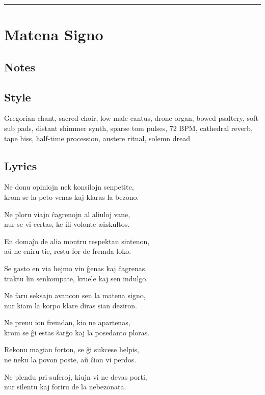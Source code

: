 \begin{center}\rule{0.5\linewidth}{0.5pt}\end{center}

\section{Matena Signo}\label{matena-signo}

\subsection{Notes}\label{notes-33}

\subsection{Style}\label{style-32}

Gregorian chant, sacred choir, low male cantus, drone organ, bowed
psaltery, soft sub pads, distant shimmer synth, sparse tom pulses, 72
BPM, cathedral reverb, tape hiss, half-time procession, austere ritual,
solemn dread

\subsection{Lyrics}\label{lyrics-32}

Ne donu opiniojn nek konsilojn senpetite,\\
krom se la peto venas kaj klaras la bezono.

Ne ploru viajn ĉagrenojn al aliuloj vane,\\
nur se vi certas, ke ili volonte aŭskultos.

En domaĵo de alia montru respektan sintenon,\\
aŭ ne eniru tie, restu for de fremda loko.

Se gasto en via hejmo vin ĝenas kaj ĉagrenas,\\
traktu lin senkompate, kruele kaj sen indulgo.

Ne faru seksajn avancon sen la matena signo,\\
nur kiam la korpo klare diras sian deziron.

Ne prenu ion fremdan, kio ne apartenas,\\
krom se ĝi estas ŝarĝo kaj la posedanto ploras.

Rekonu magian forton, se ĝi sukcese helpis,\\
ne neku la povon poste, aŭ ĉion vi perdos.

Ne plendu pri suferoj, kiujn vi ne devas porti,\\
nur silentu kaj foriru de la nebezonata.

